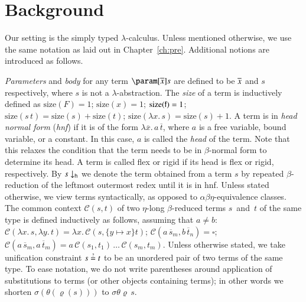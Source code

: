 

\section{Background}
\label{sec:unif:background}

Our setting is the simply typed $\lambda$-calculus. Unless mentioned otherwise,
we use the same notation as laid out in Chapter~\ref{ch:pre}. Additional notions
are introduced as follows.

\emph{Parameters} and \emph{body} for any term $\param[\seq x]s$ are defined to
be $\overline{x}$ and $s$ respectively, where $s$ is not a $\lambda$-abstraction. The
\emph{size} of a term is inductively defined as $\text{size}(F) = 1$;
$\text{size}(x) = 1$; $\text{size}(\mathsf{f}) = 1$; $\text{size}(s\,t) =
\text{size}(s) + \text{size}(t)$; $\text{size}(\lambda x.\, s) = \text{size}(s)
+ 1$. A term is in \emph{head normal form} ({\em hnf}) if it is of the form
$\lambda \overline{x}.\,a\,\overline{t}$, where $a$ is a free variable, bound
variable, or a constant. In this case, $a$ is called the \emph{head} of the
term. Note that this relaxes the condition that the term needs to be in
$\beta$-normal form to determine its head. A term is called flex or rigid if its
head is flex or rigid, respectively. By $\nf{s}{\textsf{h}}$ we denote the term
obtained from a term $s$ by repeated $\beta$-reduction of the leftmost outermost
redex until it is in hnf. Unless stated otherwise, we view terms syntactically,
as opposed to $\alpha\beta\eta$-equivalence classes. The common context
$\mathcal{C}(s,t)$ of two $\eta$-long $\beta$-reduced terms $s$~and~$t$ of the
same type is defined inductively as follows, assuming that $a \not= b$:
$\mathcal{C}(\lambda x.\, s, \lambda y.\, t) = \lambda x.\,
\mathcal{C}(s,\{y\mapsto x\}t)$; $\mathcal{C}(a\,\overline{s}_m,
b\,\overline{t}_n) = \square$; $\mathcal{C}(a\,\overline{s}_m,
a\,\overline{t}_m) = a\,\mathcal{C}(s_1,t_1)\,\ldots\,\mathcal{C}(s_m,t_m)$.
Unless otherwise stated, we take unification constraint $s \unif t$ to be an
unordered pair of two terms of the same type. To ease notation, we do not write
parentheses around application of substitutions to terms (or other objects containing terms);
in other words we shorten $\sigma(\theta(\varrho(s)))$ to $\sigma\theta\varrho \, s$.

